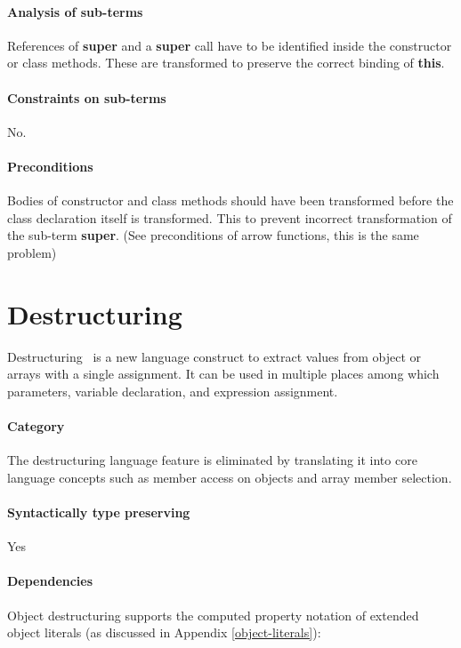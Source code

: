 \paragraph{Analysis of sub-terms}
References of \textbf{super} and a \textbf{super} call have to be identified inside the constructor or class methods. These are transformed to preserve the correct binding of \textbf{this}.

\paragraph{Constraints on sub-terms}
No.

\paragraph{Preconditions}
Bodies of constructor and class methods should have been transformed before the class declaration itself is transformed. This to prevent incorrect transformation of the sub-term \textbf{super}. (See preconditions of arrow functions, this is the same problem)

\section{Destructuring} \label{destructuring}
Destructuring~\cite[12.14.5]{SpecJS} is a new language construct to extract values from object or arrays with a single assignment. It can be used in multiple places among which parameters, variable declaration, and expression assignment.

\paragraph{Category}
The destructuring language feature is eliminated by translating it into core language concepts such as member access on objects and array member selection.

\paragraph{Syntactically type preserving}
Yes

\paragraph{Dependencies}
Object destructuring supports the computed property notation of extended object literals (as discussed in Appendix \ref{object-literals}):

